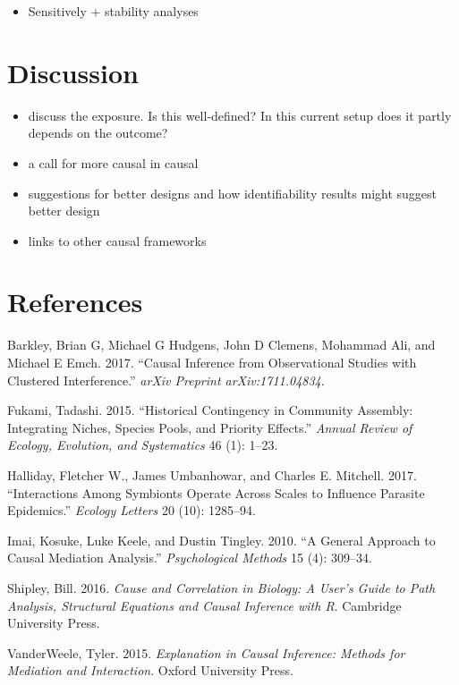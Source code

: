 \documentclass[]{article}
\providecommand{\tightlist}{%
  \setlength{\itemsep}{0pt}\setlength{\parskip}{0pt}}
\begin{document}
\begin{itemize}
\tightlist
\item
  Sensitively + stability analyses
\end{itemize}

\hypertarget{discussion}{%
\section{Discussion}\label{discussion}}

\begin{itemize}
\tightlist
\item
  discuss the exposure. Is this well-defined? In this current setup does
  it partly depends on the outcome?
\item
  a call for more causal in causal
\item
  suggestions for better designs and how identifiability results might
  suggest better design
\item
  links to other causal frameworks
\end{itemize}

\hypertarget{references}{%
\section*{References}\label{references}}

\hypertarget{refs}{}
\leavevmode\hypertarget{ref-barkley2017causal}{}%
Barkley, Brian G, Michael G Hudgens, John D Clemens, Mohammad Ali, and
Michael E Emch. 2017. ``Causal Inference from Observational Studies with
Clustered Interference.'' \emph{arXiv Preprint arXiv:1711.04834}.

\leavevmode\hypertarget{ref-fukami2015historical}{}%
Fukami, Tadashi. 2015. ``Historical Contingency in Community Assembly:
Integrating Niches, Species Pools, and Priority Effects.'' \emph{Annual
Review of Ecology, Evolution, and Systematics} 46 (1): 1--23.

\leavevmode\hypertarget{ref-halliday2017interactions}{}%
Halliday, Fletcher W., James Umbanhowar, and Charles E. Mitchell. 2017.
``Interactions Among Symbionts Operate Across Scales to Influence
Parasite Epidemics.'' \emph{Ecology Letters} 20 (10): 1285--94.

\leavevmode\hypertarget{ref-imai2010general}{}%
Imai, Kosuke, Luke Keele, and Dustin Tingley. 2010. ``A General Approach
to Causal Mediation Analysis.'' \emph{Psychological Methods} 15 (4):
309--34.

\leavevmode\hypertarget{ref-shipley2016cause}{}%
Shipley, Bill. 2016. \emph{Cause and Correlation in Biology: A User's
Guide to Path Analysis, Structural Equations and Causal Inference with
R}. Cambridge University Press.

\leavevmode\hypertarget{ref-vanderweele2015explanation}{}%
VanderWeele, Tyler. 2015. \emph{Explanation in Causal Inference: Methods
for Mediation and Interaction}. Oxford University Press.
\end{document}

